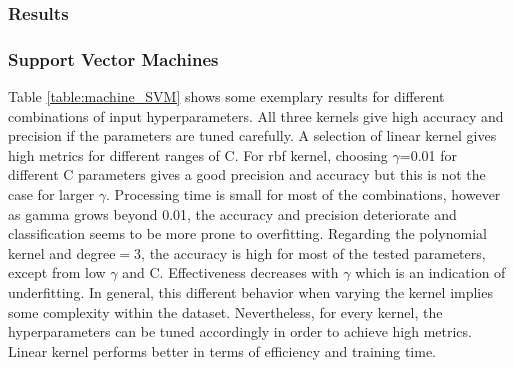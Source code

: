 \documentclass{article}
\begin{document}
\subsubsection{Results}
\subsubsection*{Support Vector Machines}
Table \ref{table:machine_SVM} shows some exemplary results for different combinations of input hyperparameters. All three kernels give high accuracy and precision if the parameters are tuned carefully. A selection of linear kernel gives high metrics for different ranges of C. For rbf kernel, choosing $\gamma$=0.01 for different C parameters gives a good precision and accuracy but this is not the case for larger $\gamma$. Processing time is small for most of the combinations, however as gamma grows beyond 0.01, the accuracy and precision deteriorate and classification seems to be more prone to overfitting. Regarding the polynomial kernel and degree$=$3, the accuracy is high for most of the tested parameters, except from low $\gamma$ and C. Effectiveness decreases with $\gamma$ which is an indication of underfitting. In general, this different behavior when varying the kernel implies some complexity within the dataset. Nevertheless, for every kernel, the hyperparameters can be tuned accordingly in order to achieve high metrics. Linear kernel performs better in terms of efficiency and training time.
\end{document}
